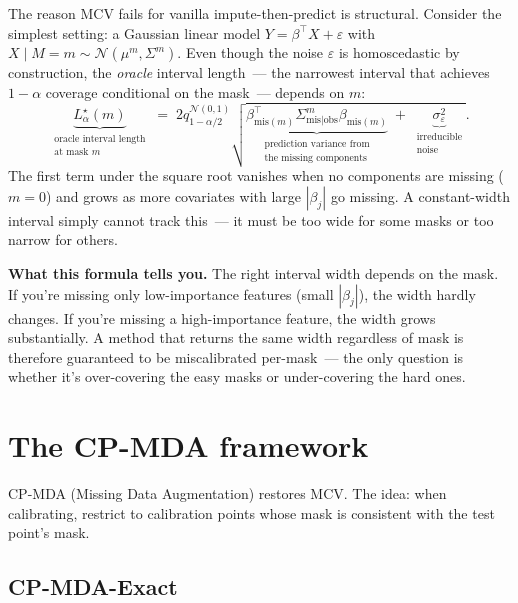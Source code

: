 \documentclass[letterpaper,11pt,leqno]{article}
\begin{document}
The reason MCV fails for vanilla impute-then-predict is structural. Consider the simplest setting: a Gaussian linear model $Y = \beta^{\top} X + \varepsilon$ with $X \mid M = m \sim \mathcal{N}(\mu^m, \Sigma^m)$. Even though the noise $\varepsilon$ is homoscedastic by construction, the \emph{oracle} interval length~--- the narrowest interval that achieves $1 - \alpha$ coverage conditional on the mask~--- depends on $m$:
\begin{equation*}
\underbrace{L_{\alpha}^{\star}(m)}_{\substack{\text{oracle interval length}\\\text{at mask } m}}
\;=\;
2 q_{1 - \alpha/2}^{\mathcal{N}(0, 1)}
\sqrt{
\underbrace{\beta_{\text{mis}(m)}^{\top} \Sigma^{m}_{\text{mis} \mid \text{obs}} \beta_{\text{mis}(m)}}_{\substack{\text{prediction variance from}\\\text{the missing components}}}
\;+\;
\underbrace{\sigma_{\varepsilon}^{2}}_{\substack{\text{irreducible}\\\text{noise}}}
}.
\end{equation*}
The first term under the square root vanishes when no components are missing ($m = 0$) and grows as more covariates with large $|\beta_j|$ go missing. A constant-width interval simply cannot track this~--- it must be too wide for some masks or too narrow for others.

\begin{explain}
\textbf{What this formula tells you.} The right interval width depends on the mask. If you're missing only low-importance features (small $|\beta_j|$), the width hardly changes. If you're missing a high-importance feature, the width grows substantially. A method that returns the same width regardless of mask is therefore guaranteed to be miscalibrated per-mask~--- the only question is whether it's over-covering the easy masks or under-covering the hard ones.
\end{explain}

\section{The CP-MDA framework}\label{s:cpmda}

CP-MDA (Missing Data Augmentation) restores MCV. The idea: when calibrating, restrict to calibration points whose mask is consistent with the test point's mask.

\subsection*{CP-MDA-Exact}
\end{document}
